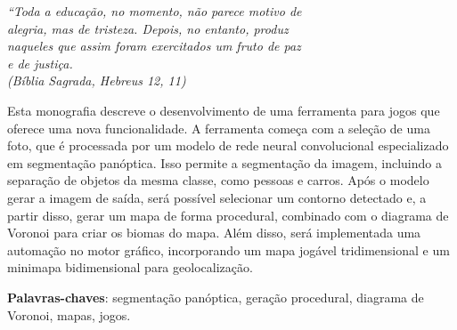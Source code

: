 \documentclass[
	12pt,				%
	openright,			%
	twoside,			%
	a4paper,			%
	english,			%
	french,				%
	spanish,			%
	brazil				%
	]{abntex2}
\begin{document}



\begin{epigrafe}
    \vspace*{\fill}
	\begin{flushright}
		\textit{``Toda a educação, no momento, não parece motivo de \\
    alegria, mas de tristeza. Depois, no entanto, produz \\ 
    naqueles que assim foram exercitados um fruto de paz \\
    e de justiça.\\
		(Bíblia Sagrada, Hebreus 12, 11)}
	\end{flushright}
\end{epigrafe}


\setlength{\absparsep}{18pt} %
\begin{resumo}
  Esta monografia descreve o desenvolvimento de uma ferramenta para jogos que oferece uma nova funcionalidade. A ferramenta começa com a seleção de uma foto, que é processada por um modelo de rede neural convolucional especializado em segmentação panóptica. Isso permite a segmentação da imagem, incluindo a separação de objetos da mesma classe, como pessoas e carros. Após o modelo gerar a imagem de saída, será possível selecionar um contorno detectado e, a partir disso, gerar um mapa de forma procedural, combinado com o diagrama de Voronoi para criar os biomas do mapa. Além disso, será implementada uma automação no motor gráfico, incorporando um mapa jogável tridimensional e um minimapa bidimensional para geolocalização.

 \textbf{Palavras-chaves}: segmentação panóptica, geração procedural, diagrama de Voronoi, mapas, jogos.
\end{resumo}
\end{document}
